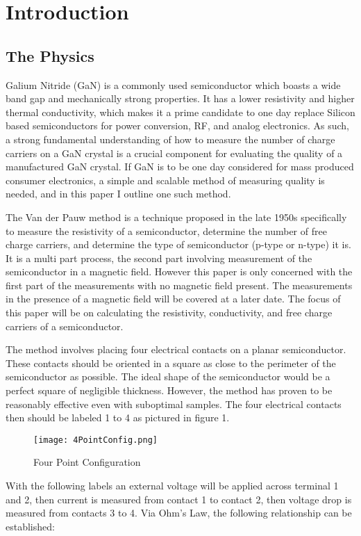 \section{Introduction}
\subsection{The Physics}
	Galium Nitride (GaN) is a commonly used semiconductor which boasts a wide band gap and mechanically strong properties. It has a lower resistivity and higher thermal conductivity, which makes it a prime candidate to one day replace Silicon based semiconductors for power conversion, RF, and analog electronics. As such, a strong fundamental understanding of how to measure the number of charge carriers on a GaN crystal is a crucial component for evaluating the quality of a manufactured GaN crystal. If GaN is to be one day considered for mass produced consumer electronics, a simple and scalable method of measuring quality is needed, and in this paper I outline one such method.
	
	The Van der Pauw method is a technique proposed in the late 1950s specifically to measure the resistivity of a semiconductor, determine the number of free charge carriers, and determine the type of semiconductor (p-type or n-type) it is. It is a multi part process, the second part involving measurement of the semiconductor in a magnetic field. However this paper is only concerned with the first part of the measurements with no magnetic field present. The measurements in the presence of a magnetic field will be covered at a later date. The focus of this paper will be on calculating the resistivity, conductivity, and free charge carriers of a semiconductor.
	
	The method involves placing four electrical contacts on a planar semiconductor. These contacts should be oriented in a square as close to the perimeter of the semiconductor as possible. The ideal shape of the semiconductor would be a perfect square of negligible thickness. However, the method has proven to be reasonably effective even with suboptimal samples. The four electrical contacts then should be labeled 1 to 4 as pictured in figure 1.

\begin{figure}[hbt!]
\centering
\texttt{[image: 4PointConfig.png]}
\caption{Four Point Configuration}\label{fig:ligmaballs}
\end{figure}

With the following labels an external voltage will be applied across terminal 1 and 2, then current is measured from contact 1 to contact 2, then voltage drop is measured from contacts 3 to 4. Via Ohm’s Law, the following relationship can be established:


